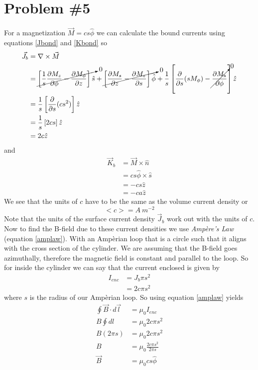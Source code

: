 \documentclass[11pt]{article}
\numberwithin{equation}{section}
\newcommand{\grad}{\bold\nabla}
\begin{document}
\section{Problem \#5}
For a magnetization $\vec{M} = cs\hat{\phi}$ we can calculate the bound currents using equations \ref{Jbond} and \ref{Kbond} so
\begin{align*}
\vec{J}_b &= \grad\times\vec{M}\\
&= \cancelto{0}{\left[\frac{1}{s}\frac{\partial M_z}{\partial\phi} - \frac{\partial M_{\phi}}{\partial z}\right]\hat{s}} + \cancelto{0}{\left[\frac{\partial M_s}{\partial z} - \frac{\partial M_{z}}{\partial s}\right]\hat{\phi}} + \frac{1}{s}\left[\frac{\partial}{\partial s}(sM_{\phi}) - \cancelto{0}{\frac{\partial M_s}{\partial\phi}}\right]\hat{z}\\
&= \frac{1}{s}\left[\frac{\partial}{\partial s}(cs^2)\right]\hat{z}\\
&= \frac{1}{s}\left[2cs\right]\hat{z}\\
&= 2c\hat{z}
\end{align*}
and
\begin{align*}
\vec{K}_b &= \vec{M}\times\hat{n}\\
&= cs\hat{\phi}\times\hat{s}\\
&= -cs\hat{z}\\
&= -ca\hat{z}
\end{align*}
We see that the units of $c$ have to be the same as the volume current density or
$$<c> = A\ m^{-2}$$
Note that the units of the surface current density $\vec{J}_b$ work out with the units of $c$. Now to find the B-field due to these current densities we use \emph{Amp\`{e}re's Law} (equation \ref{amplaw}). With an Amp\`{e}rian loop that is a circle such that it aligns with the cross section of the cylinder. We are assuming that the B-field goes azimuthally, therefore the magnetic field is constant and parallel to the loop. So for inside the cylinder we can say that the current enclosed is given by 
\begin{align*}
I_{enc} &= {J_b}{\pi s^2}\\
&= {2c}{\pi s^2}
\end{align*}
where $s$ is the radius of our Amp\`{e}rian loop. So using equation \ref{amplaw} yields
\begin{align*}
\oint\vec{B}\cdot d\vec{l} &= \mu_0 I_{enc}\\
B\oint dl &= \mu_0 {2c}{\pi s^2}\\
B(2\pi s) &= \mu_0 {2c}{\pi s^2}\\
B &= \mu_0 \frac{2c\pi s^2}{2\pi s}\\
\vec{B} &= \mu_0 c s\hat{\phi}
\end{align*}
\end{document}

